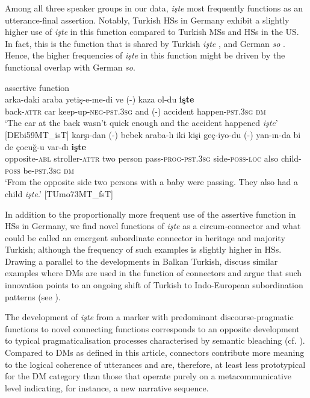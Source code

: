 \documentclass[output=paper,colorlinks,citecolor=brown]{langscibook}
\begin{document}
\noindent Among all three speaker groups in our data, \textit{işte} most frequently functions as an utterance-final assertion. Notably, Turkish HSs in Germany exhibit a slightly higher use of \textit{işte} in this function  compared to Turkish MSs and HSs in the US. In fact, this is the function that is shared by Turkish \textit{işte} ,  and German \textit{so} . Hence, the higher frequencies of \textit{işte} in this function might be driven by the functional overlap with German \textit{so}.

\ea assertive function\label{ex:labrenzetal:15}\\
  \ea \label{ex:labrenzetal:15a}
\gll arka-daki araba yetiş-e-me-di ve (-) kaza ol-du \textbf{işte}\\
back-\textsc{attr} car keep-up-\textsc{neg-pst.3sg} and (-) accident happen-\textsc{pst.3sg} \textsc{dm}\\
\glt ‘The car at the back wasn’t quick enough and the accident happened \textit{işte}’ 
\hfill[DEbi59MT\_isT]
  \ex \label{ex:labrenzetal:15b}
\gll karşı-dan (-) {bebek araba-lı} iki kişi geç-iyo-du (-) yan-ın-da {bi de} çocuğ-u var-dı \textbf{işte} \\ opposite-\textsc{abl} {} stroller-\textsc{attr} two person pass-\textsc{prog}-\textsc{pst.3sg} {} side-\textsc{poss}-\textsc{loc} also child-\textsc{poss} be-\textsc{pst.3sg} \textsc{dm}\\
\glt ‘From the opposite side two persons with a baby were passing. They also had a child \textit{işte}.’ \hfill [TUmo73MT\_fsT]
  \z
\z

\noindent In addition to the proportionally more frequent use of the assertive function in HSs in Germany, we find novel functions of \textit{işte} as a circum-connector  and what could be called an emergent subordinate connector  in heritage and majority Turkish; although the frequency of such examples is slightly higher in HSs. Drawing a parallel to the developments in Balkan Turkish, \citet{keskin_aspects_nodate} discuss similar examples where DMs are used in the function of connectors and argue that such innovation points to an ongoing shift of Turkish to Indo-European subordination patterns (see \cite{chapters/09}). 

The development of \textit{işte} from a marker with predominant discourse-pragmatic functions to novel connecting functions corresponds to an opposite development to typical pragmaticalisation processes characterised by semantic bleaching (cf. ). Compared to DMs as defined in this article, connectors contribute more meaning to the logical coherence of utterances and are, therefore, at least less prototypical for the DM category than those that operate purely on a metacommunicative level indicating, for instance, a new narrative sequence.
\end{document}
